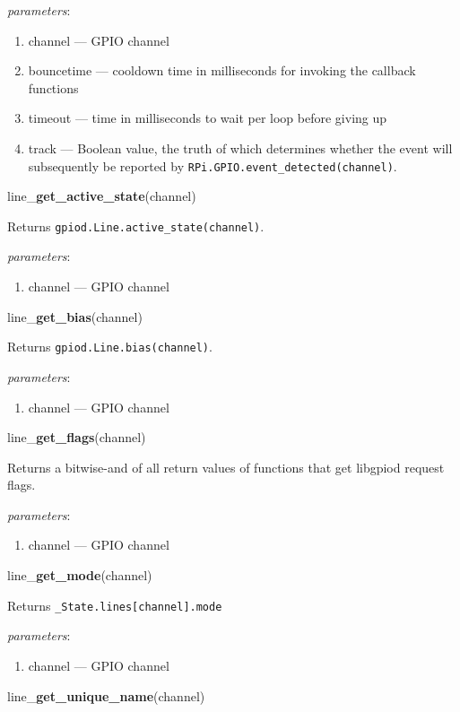 \documentclass[12pt]{article}
\begin{document}
\textit{parameters}:
\begin{enumerate}      
        \item channel --- GPIO channel
        \item bouncetime --- cooldown time in milliseconds for invoking the callback functions
        \item timeout --- time in milliseconds to wait per loop before giving up
        \item track --- Boolean value, the truth of which determines whether the event will subsequently be reported by \texttt{RPi.GPIO.event\_detected(channel)}.
\end{enumerate}

\noindent line\_\textbf{get\_active\_state}(channel)

Returns \texttt{gpiod.Line.active\_state(channel)}.

\textit{parameters}:
\begin{enumerate}      
        \item channel --- GPIO channel
\end{enumerate}

\noindent line\_\textbf{get\_bias}(channel)

Returns \texttt{gpiod.Line.bias(channel)}.

\textit{parameters}:
\begin{enumerate}      
        \item channel --- GPIO channel
\end{enumerate}

\noindent line\_\textbf{get\_flags}(channel)

Returns a bitwise-and of all return values of functions that get libgpiod request flags.

\textit{parameters}:
\begin{enumerate}      
        \item channel --- GPIO channel
\end{enumerate}

\noindent line\_\textbf{get\_mode}(channel)

Returns \texttt{\_State.lines[channel].mode}

\textit{parameters}:
\begin{enumerate}      
        \item channel --- GPIO channel
\end{enumerate}

\noindent line\_\textbf{get\_unique\_name}(channel)
\end{document}

